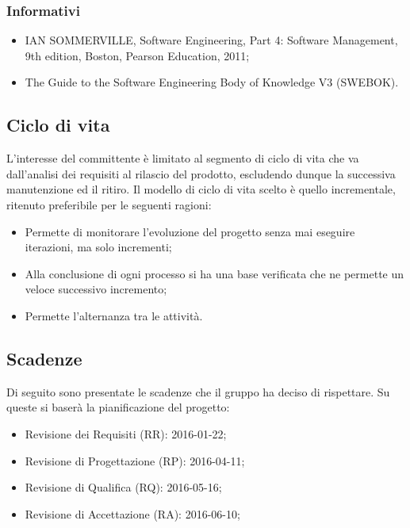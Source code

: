 \subsubsection{Informativi}
\begin{itemize}
\item IAN SOMMERVILLE, Software Engineering, Part 4: Software Management, 9th edition, Boston, Pearson Education, 2011;
\item The Guide to the Software Engineering Body of Knowledge V3 (SWEBOK).
\end{itemize}

\subsection{Ciclo di vita}
L’interesse del committente è limitato al segmento di ciclo di vita che va dall’analisi dei requisiti al
rilascio del prodotto, escludendo dunque la successiva manutenzione ed il ritiro. Il modello di ciclo di
vita scelto \`e quello incrementale, ritenuto preferibile per le seguenti ragioni:
\begin{itemize}
\item Permette di monitorare l'evoluzione del progetto senza mai eseguire iterazioni, ma solo incrementi;
\item Alla conclusione di ogni processo si ha una base verificata che ne permette un veloce successivo incremento;
\item Permette l'alternanza tra le attivit\`a.
\end{itemize}

\subsection{Scadenze}
Di seguito sono presentate le scadenze che il gruppo ha deciso di rispettare. Su queste si baserà la pianificazione del progetto:
\begin{itemize}
\item Revisione dei Requisiti (RR): 2016-01-22;
\item Revisione di Progettazione (RP): 2016-04-11;
\item Revisione di Qualifica (RQ): 2016-05-16;
\item Revisione di Accettazione (RA): 2016-06-10;
\end{itemize}

